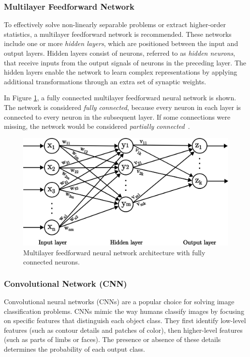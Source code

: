 \documentclass[a4paper,oneside,onecolumn,12pt]{book}
\begin{document}
		\subsubsection{Multilayer Feedforward Network}
		To effectively solve non-linearly separable problems or extract higher-order statistics, a multilayer feedforward network is recommended. These networks include one or more \textit{hidden layers}, which are positioned between the input and output layers. Hidden layers consist of neurons, referred to as \textit{hidden neurons}, that receive inputs from the output signals of neurons in the preceding layer. The hidden layers enable the network to learn complex representations by applying additional transformations through an extra set of synaptic weights. 

		In Figure \ref{fig:smultilayer feedforward nn}, a fully connected multilayer feedforward neural network is shown. The network is considered \textit{fully connected}, because every neuron in each layer is connected to every neuron in the subsequent layer. If some connections were missing, the network would be considered \textit{partially connected}~\cite{NNACF}.
		\begin{figure}[H]
		\begin{center}
			\includegraphics[keepaspectratio,width=14cm]{kep/multi_layer_feedforward_nn.png}
			\caption{Multilayer feedforward neural network architecture with fully connected neurons.}
			\label{fig:smultilayer feedforward nn}
		\end{center}
		\end{figure}
		
		\subsubsection{Convolutional Network (CNN)}
		Convolutional neural networks (CNNs) are a popular choice for solving image classification problems. CNNs mimic the way humans classify images by focusing on specific features that distinguish each object class. They first identify low-level features (such as contour details and patches of color), then higher-level features (such as parts of limbs or faces). The presence or absence of these details determines the probability of each output class.
\end{document}
